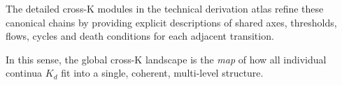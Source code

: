 The detailed cross-K modules in the technical derivation atlas refine these
canonical chains by providing explicit descriptions of shared axes,
thresholds, flows, cycles and death conditions for each adjacent transition.

In this sense, the global cross-K landscape is the \emph{map} of how all
individual continua $K_d$ fit into a single, coherent, multi-level
structure.
